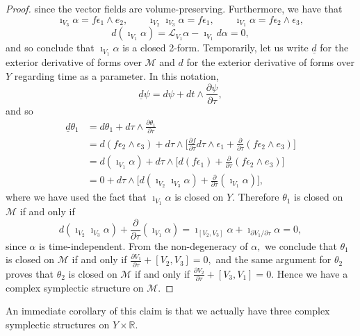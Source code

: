 \documentclass[a4paper,onecolumn,12pt]{article}
\theoremstyle{definition}
\theoremstyle{remark}
\newcommand{\e}{\epsilon}
\newcommand{\dd}[2]{\frac{\partial #1}{\partial #2}}
\newcommand{\R}{\mathbb{R}}
\begin{document}
\begin{proof}
	since the vector fields are volume-preserving. Furthermore, we have that 
	\begin{equation*}
	\imath_{V_{3}}\alpha = f\e_{1}\wedge e_{2},\qquad \imath_{V_{2}}\imath_{V_{3}}\alpha = f\e_{1},\qquad \imath_{V_{1}}\alpha=f\e_{2}\wedge\e_{3},
	\end{equation*}
	\begin{equation*}
	d(\imath_{V_{1}}\alpha) = \mathcal{L}_{V_{1}}\alpha - \imath_{V_{1}}d\alpha = 0,
	\end{equation*}
	and so conclude that $\imath_{V_{1}}\alpha$ is a closed 2-form. Temporarily, let us write $\underline{d}$ for the exterior derivative of forms over $\mathcal{M}$ and $d$ for the exterior derivative of forms over $Y$ regarding time as a parameter. In this notation,
	\begin{equation*}
	\underline{d}\psi = d\psi + dt\wedge\dd{\psi}{\tau},
	\end{equation*}
	and so
	\begin{align*}
	\underline{d}\theta_{1} &= d\theta_{1} + d\tau \wedge \dd{\theta_{1}}{\tau}\\
	&= d(f\e_{2}\wedge\e_{3}) + d\tau\wedge \Bigg[\dd{f}{\tau} d\tau\wedge\e_{1} + \dd{}{\tau}(f \e_{2} \wedge e_{3})\Bigg]\\
	&= d(\imath_{V_{1}}\alpha) + d\tau\wedge \Bigg[d(f\e_{1}) + \dd{}{\tau}(f \e_{2} \wedge e_{3})\Bigg]\\
	&= 0 + d\tau\wedge \Bigg[d(\imath_{V_{2}}\imath_{V_{3}}\alpha) + \dd{}{\tau}(\imath_{V_{1}}\alpha)\Bigg],
	\end{align*}
	where we have used the fact that $\imath_{V_{1}}\alpha$ is closed on $Y.$ Therefore $\theta_{1}$ is closed on $\mathcal{M}$ if and only if
	\begin{equation*}
	d(\imath_{V_{2}}\imath_{V_{3}}\alpha) + \dd{}{\tau}(\imath_{V_{1}}\alpha)
	= \imath_{[V_{2},V_{3}]}\alpha + \imath_{\partial V_{1}/\partial\tau}\alpha
	= 0,
	\end{equation*}
	since $\alpha$ is time-independent. From the non-degeneracy of $\alpha,$ we conclude that $\theta_{1}$ is closed on $\mathcal{M}$ if and only if $\dd{V_{1}}{\tau} + [V_{2},V_{3}] = 0,$ and the same argument for $\theta_{2}$ proves that $\theta_{2}$ is closed on $\mathcal{M}$ if and only if $\dd{V_{2}}{\tau} + [V_{3},V_{1}] = 0.$ Hence we have a complex symplectic structure on $\mathcal{M}.$
\end{proof}
An immediate corollary of this claim is that we actually have three complex symplectic structures on $Y\times\R.$\\
\end{document}
